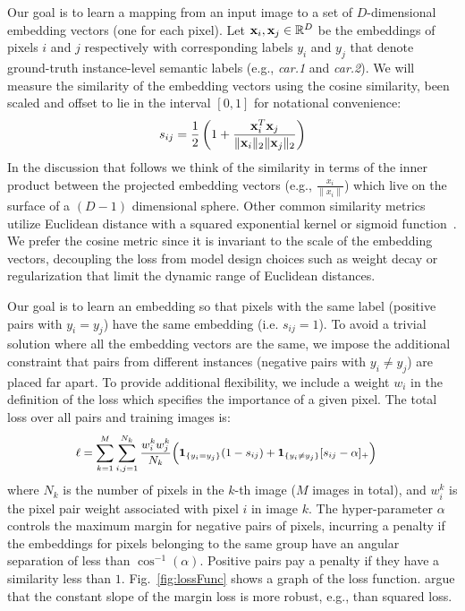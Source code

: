 \documentclass[10pt,twocolumn,letterpaper]{article}
\def\x{{\bf x}}
\def\1{{\bf 1}}
\begin{document}
Our goal is to learn a mapping from an input image to a set of $D$-dimensional
embedding vectors (one for each pixel).  Let $\x_i,\x_j \in {\mathbb R}^D$ be the
embeddings of pixels $i$ and $j$ respectively with corresponding labels $y_i$
and $y_j$ that denote ground-truth instance-level semantic labels (e.g., {\em
car.1} and {\em car.2}). We will measure the similarity of the embedding vectors
using the cosine similarity, been scaled and offset to lie in the interval
$[0,1]$ for notational convenience:
\begin{equation}
\begin{split} \small
s_{ij} = \frac{1}{2}\left(1 + \frac{\x_i^T\x_j}{\Vert\x_i\Vert_2 \Vert\x_j\Vert_2}\right)
\end{split}
\label{eq:calibrated_cosine_similarity}
\end{equation}
In the discussion that follows we think of the similarity in terms of the inner
product between the projected embedding vectors (e.g., $\frac{x_i}{\|x_i\|}$)
which live on the surface of a $(D-1)$ dimensional sphere.  Other common
similarity metrics utilize Euclidean distance with a squared exponential kernel
or sigmoid function~\cite{newell2016associative, fathi2017semantic}. We prefer
the cosine metric since it is invariant to the scale of the embedding vectors,
decoupling the loss from model design choices such as weight decay or
regularization that limit the dynamic range of Euclidean distances.

Our goal is to learn an embedding so that pixels with the same label (positive
pairs with $y_i = y_j$) have the same embedding (i.e. $s_{ij}=1$). To avoid a
trivial solution where all the embedding vectors are the same, we impose the
additional constraint that pairs from different instances (negative pairs with
$y_i \neq y_j$) are placed far apart. To provide additional flexibility, we
include a weight $w_i$ in the definition of the loss which specifies the
importance of a given pixel. The total loss over all pairs and training images
is:
\begin{equation}
\small
\begin{split}
\ell = \sum_{k=1}^M  \sum_{i,j=1}^{N_k} \frac{w^k_i w^k_j}{N_k} \Big( \1_{\{y_i=y_j\}}(1-s_{ij})
 &+ \1_{\{y_i\not=y_j\}} [s_{ij}-\alpha]_{+} \Big)
\end{split}
\label{eq:obj}
\end{equation}
where $N_k$ is the number of pixels in the $k$-th image ($M$ images in
total), and $w^k_i$ is the pixel pair weight associated with pixel
$i$ in image $k$.  The hyper-parameter $\alpha$ controls the maximum margin
for negative pairs of pixels, incurring a penalty if the embeddings for pixels
belonging to the same group have an angular separation of less than
$\cos^{-1}(\alpha)$.  Positive pairs pay a penalty if they have a similarity
less than $1$.  Fig.~\ref{fig:lossFunc} shows a graph of the loss function.
\cite{wu2017sampling} argue that the constant slope of the margin loss is more
robust, e.g., than squared loss.
\end{document}
